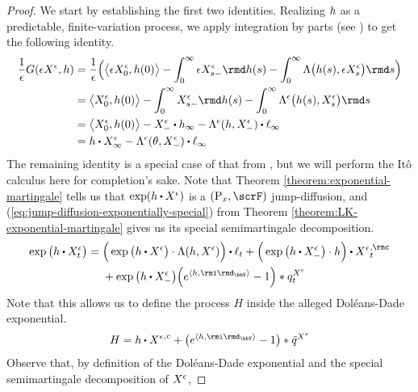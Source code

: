 \begin{proof}
  We start by establishing the first two identities.
  Realizing $h$ as a predictable, finite-variation process, we apply integration by parts (see \cite[Proposition I.4.49(b)]{jacod2003}) to get the following identity.
  \begin{align*}
    \frac1\epsilon \mgRf(\Xe, \twistFunc)
    &= \frac1\epsilon \Big( \bprj{\Xe_0}{\twistFunc(0)} - \int_0^\infty \Xe_{s-} \rmd\twistFunc(s) - \int_0^\infty \ode\big( \twistFunc(s), \Xe_s \big) \rmd s \Big) \\
    &= \bprj{\Xee_0}{\twistFunc(0)} - \int_0^\infty \Xee_{s-} \rmd\twistFunc(s) - \int_0^\infty \ode^\epsilon\big( \twistFunc(s), \Xee_s \big) \rmd s \\
    &= \bprj{\Xee_0}{\twistFunc(0)} - \Xee_- \shortInt \twistFunc_\infty - \ode^\epsilon(\twistFunc, \Xee_-) \shortInt \leb_\infty \\
    &= \twistFunc \shortInt \Xee_\infty - \ode^\epsilon(\twistVar, \Xee_-) \shortInt \leb_\infty
  \end{align*}
  The remaining identity is a special case of that from \cite[Theorem III.7.24]{jacod2003}, but we will perform the It\^o calculus here for completion's sake.
  Note that Theorem \ref{theorem:exponential-martingale} tells us that $\exp(\twistFunc \shortInt \Xee)$ is a $(\Prb_\stateVar, \scrF)$ jump-diffusion, and (\ref{eq:jump-diffusion-exponentially-special}) from Theorem \ref{theorem:LK-exponential-martingale} gives us its special semimartingale decomposition.
  \begin{equation*}
    \exp\big( \twistFunc \shortInt \Xee_t \big) 
    = \begin{aligned}[t]
      &\Big(\exp\big( \twistFunc \shortInt \Xee \big) \cdot \ode(\twistFunc, \Xee) \Big) \shortInt \leb_t + \Big( \exp\big( \twistFunc \shortInt \Xee_- \big) \cdot \twistFunc \Big) \shortInt {\Xee}^{,\rmc}_t \\
      &+ \exp\big(\twistFunc\shortInt\Xee_-\big) \Big( e^{\prj{\twistFunc}{\id_\vecSpace}} - 1 \Big) \ast \jumpMeas^{\Xee}_t
    \end{aligned} 
  \end{equation*}
  Note that this allows us to define the process $H$ inside the alleged Dol\'eans-Dade exponential.
  \begin{equation*}
    H = \twistFunc \shortInt {\Xee}^{,c} + \big( e^\prj{\twistFunc}{\id_\vecSpace} - 1 \big) \ast \compensate{\jumpMeas^{\Xee}}
  \end{equation*}
  Observe that, by definition of the Dol\'eans-Dade exponential and the special semimartingale decomposition of $X^\epsilon$,

\end{proof}
